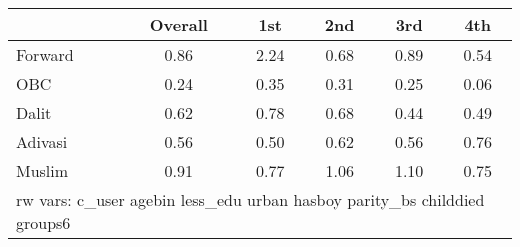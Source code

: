 \begin{tabular}{l*{5}{c}}
\toprule
            &\multicolumn{1}{c}{Overall}&\multicolumn{1}{c}{1st}&\multicolumn{1}{c}{2nd}&\multicolumn{1}{c}{3rd}&\multicolumn{1}{c}{4th}\\
\midrule
\midrule
Forward     &        0.86&        2.24&        0.68&        0.89&        0.54\\
OBC         &        0.24&        0.35&        0.31&        0.25&        0.06\\
Dalit       &        0.62&        0.78&        0.68&        0.44&        0.49\\
Adivasi     &        0.56&        0.50&        0.62&        0.56&        0.76\\
Muslim      &        0.91&        0.77&        1.06&        1.10&        0.75\\
\bottomrule
\multicolumn{6}{l}{\footnotesize rw vars: c\_user agebin less\_edu urban hasboy parity\_bs childdied groups6}\\
\end{tabular}
